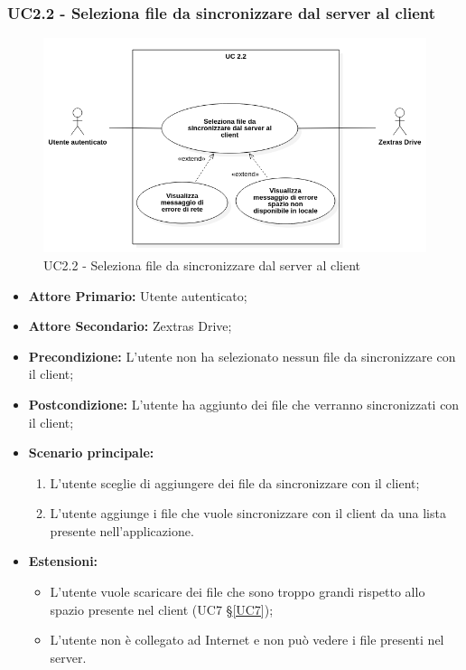 \subsubsection{UC2.2 - Seleziona file da sincronizzare dal server al client}
\begin{figure}[H]
    \centering
    \includegraphics[scale = 0.6]{components/img/UC2_2.png}
    \caption{UC2.2 - Seleziona file da sincronizzare dal server al client}
\end{figure}
\begin{itemize}
\item \textbf{Attore Primario:} Utente autenticato;
\item \textbf{Attore Secondario:} Zextras Drive;
\item \textbf{Precondizione:} L'utente non ha selezionato nessun file da sincronizzare con il client;
\item \textbf{Postcondizione:} L'utente ha aggiunto dei file che verranno sincronizzati con il client;
\item \textbf{Scenario principale:}
    \begin{enumerate}
    \item L'utente sceglie di aggiungere dei file da sincronizzare con il client;
    \item L'utente aggiunge i file che vuole sincronizzare con il client da una lista presente nell'applicazione.
    \end{enumerate}
\item \textbf{Estensioni:}
    \begin{itemize}
    \item L'utente vuole scaricare dei file che sono troppo grandi rispetto allo spazio presente nel client (UC7 \S{}\ref{UC7});
    \item L'utente non è collegato ad Internet e non può vedere i file presenti nel server.
    \end{itemize}
\end{itemize}

